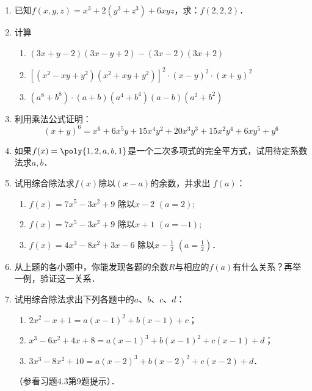 \begin{enumerate}
\item 已知$f(x,y,z)=x^3+2(y^3+z^3)+6xyz$，求：$f(2,2,2)$．

\item 计算
\begin{enumerate}
    \item $(3x+y-2)(3x-y+2)-(3x-2)(3x+2)$
    \item $\left[(x^2-xy+y^2)(x^2+xy+y^2)\right]^2\cdot (x-y)^2\cdot (x+y)^2$
    \item $(a^8+b^8)\cdot (a+b)(a^4+b^4)(a-b)(a^2+b^2)$
\end{enumerate}

\item 利用乘法公式证明：
\[(x+y)^6=x^6+6x^5y+15x^4y^2+20x^3y^3+15x^2y^4+6xy^5+y^6\]
\item 如果$f(x)=\poly{1,2,a,b,1}$是一个二次多项式的完全平方式，试用待定系数法求$a,b$．
\item  试用综合除法求$f(x)$除以$(x-a)$的余数，并求出
$f (a)$：
\begin{enumerate}
    \item $f(x)=7x^5-3x^2+9$ 除以$x-2$ $(a=2)$;
    \item $f(x)=7x^5-3x^2+9$ 除以$x+1$ $(a=-1)$;
    \item $f(x)=4x^3-8x^2+3x-6$ 除以$x-\frac{1}{2}$ $(a=\frac{1}{2})$．
\end{enumerate}

\item 从上题的各小题中，你能发现各题的余数$R$与相应的$f(a)$有什么关系？再举一例，验证这一关系．
\item 试用综合除法求出下列各题中的$a$、$b$、$c$、$d$：
\begin{enumerate}
    \item $2x^2-x+1=a(x-1)^2+b(x-1)+c$；
    \item $x^3-6x^2+4x+8=a(x-1)^3+b(x-1)^2+c(x-1)+d$；
    \item $3x^3-8x^2+10=a(x-2)^3+b(x-2)^2+c(x-2)+d$．
\end{enumerate}
（参看习题4.3第9题提示）．


\end{enumerate}
